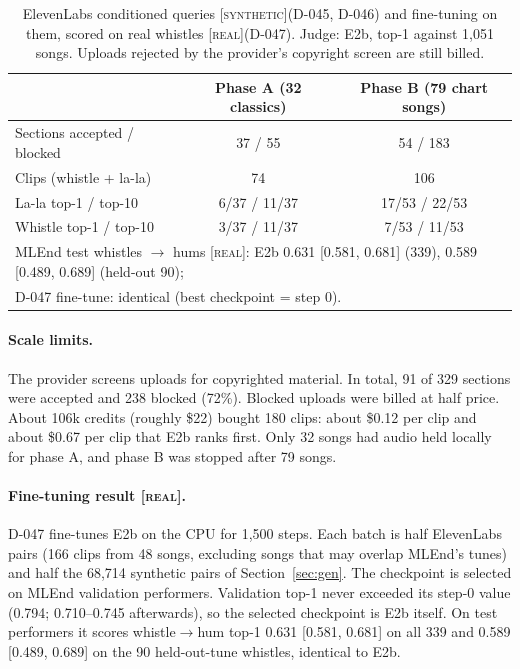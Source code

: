 \documentclass[11pt]{article}
\newcommand{\syn}{\textsc{[synthetic]}}
\newcommand{\real}{\textsc{[real]}}
\begin{document}
\begin{table}[t]
\centering
\caption{ElevenLabs conditioned queries \syn (D-045, D-046) and fine-tuning on them, scored on real whistles \real (D-047). Judge: E2b, top-1 against 1,051 songs. Uploads rejected by the provider's copyright screen are still billed.}
\label{tab:elevenlabs}
\small
\setlength{\tabcolsep}{4pt}
\begin{tabular}{lcc}
\toprule
 & Phase A (32 classics) & Phase B (79 chart songs) \\
\midrule
Sections accepted / blocked & 37 / 55 & 54 / 183 \\
Clips (whistle + la-la) & 74 & 106 \\
La-la top-1 / top-10 & 6/37 / 11/37 & 17/53 / 22/53 \\
Whistle top-1 / top-10 & 3/37 / 11/37 & 7/53 / 11/53 \\
\midrule
\multicolumn{3}{l}{MLEnd test whistles $\to$ hums \real: E2b 0.631 [0.581, 0.681] (339), 0.589 [0.489, 0.689] (held-out 90);} \\
\multicolumn{3}{l}{D-047 fine-tune: identical (best checkpoint = step 0).} \\
\bottomrule
\end{tabular}
\end{table}

\paragraph{Scale limits.} The provider screens uploads for copyrighted material. In total, 91 of 329 sections were accepted and 238 blocked (72\%). Blocked uploads were billed at half price. About 106k credits (roughly \$22) bought 180 clips: about \$0.12 per clip and about \$0.67 per clip that E2b ranks first. Only 32 songs had audio held locally for phase A, and phase B was stopped after 79 songs.

\paragraph{Fine-tuning result \real.} D-047 fine-tunes E2b on the CPU for 1,500 steps. Each batch is half ElevenLabs pairs (166 clips from 48 songs, excluding songs that may overlap MLEnd's tunes) and half the 68,714 synthetic pairs of Section~\ref{sec:gen}. The checkpoint is selected on MLEnd validation performers. Validation top-1 never exceeded its step-0 value (0.794; 0.710--0.745 afterwards), so the selected checkpoint is E2b itself. On test performers it scores whistle$\to$hum top-1 0.631 [0.581, 0.681] on all 339 and 0.589 [0.489, 0.689] on the 90 held-out-tune whistles, identical to E2b.
\end{document}
